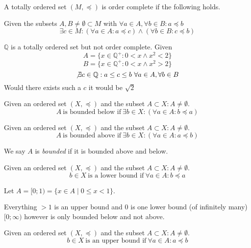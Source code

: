 \begin{definition}
   A totally ordered set \((M, \preceq)\) is order complete if the following holds.

   Given the subsets \(A, B \neq \emptyset \subset M\) with \(\forall a \in A, \forall b \in B: a \preceq b\)
   \[\exists c \in M: (\forall a \in A: a \preceq c) \land (\forall b \in B: c \preceq b)\]
\end{definition}
\begin{remark}
   \(\mathbb{Q}\) is a totally ordered set but not order complete. Given
   \[A = \{x \in \mathbb{Q}^+: 0 < x \land x^2 < 2\}\]
   \[B = \{x \in \mathbb{Q}^+: 0 < x \land x^2 > 2\}\]
   \[\not\exists c \in \mathbb{Q}: a \leq c \leq b~\forall a \in A, \forall b \in B\]
   Would there exists such a \(c\) it would be \(\sqrt{2}\)
\end{remark}

\begin{definition}
   Given an ordered set \((X, \preceq)\) and the subset \(A \subset X: A \neq \emptyset\).
   \[A~\text{is bounded below if}~\exists b \in X: (\forall a \in A: b \preceq a)\]
\end{definition}

\begin{definition}
   Given an ordered set \((X, \preceq)\) and the subset \(A \subset X: A \neq \emptyset\).
   \[A~\text{is bounded above if}~\exists b \in X: (\forall a \in A: a \preceq b)\]
\end{definition}
\begin{remark}
   We say \(A\) is \textit{bounded} if it is bounded above and below.
\end{remark}

\begin{definition}
   Given an ordered set \((X, \preceq)\) and the subset \(A \subset X: A \neq \emptyset\).
   \[b \in X~\text{is a lower bound if}~\forall a \in A: b \preceq a\]
\end{definition}
\begin{example}
   Let \(A = [0;1) = \{x \in A \mid 0 \leq x < 1\}\).

   Everything \(> 1\) is an upper bound and \(0\) is one lower bound (of infinitely many)
   \([0;\infty)\) however is only bounded below and not above.
\end{example}

\begin{definition}
   Given an ordered set \((X, \preceq)\) and the subset \(A \subset X: A \neq \emptyset\).
   \[b \in X~\text{is an upper bound if}~\forall a \in A: a \preceq b\]
\end{definition}


